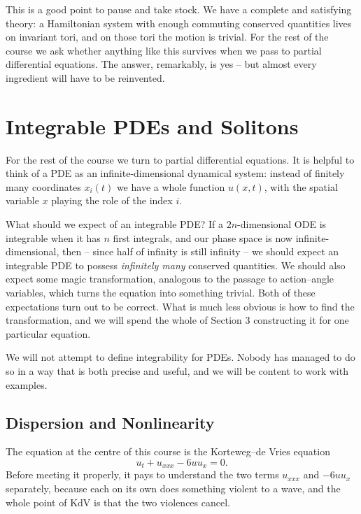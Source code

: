 \documentclass[a4paper]{scrartcl}
\begin{document}
This is a good point to pause and take stock. We have a complete and satisfying theory: a Hamiltonian system with enough commuting conserved quantities lives on invariant tori, and on those tori the motion is trivial. For the rest of the course we ask whether anything like this survives when we pass to partial differential equations. The answer, remarkably, is yes -- but almost every ingredient will have to be reinvented.

\section{Integrable PDEs and Solitons}

For the rest of the course we turn to partial differential equations. It is helpful to think of a PDE as an infinite-dimensional dynamical system: instead of finitely many coordinates $x_i(t)$ we have a whole function $u(x,t)$, with the spatial variable $x$ playing the role of the index $i$.

What should we expect of an integrable PDE? If a $2n$-dimensional ODE is integrable when it has $n$ first integrals, and our phase space is now infinite-dimensional, then -- since half of infinity is still infinity -- we should expect an integrable PDE to possess \emph{infinitely many} conserved quantities. We should also expect some magic transformation, analogous to the passage to action--angle variables, which turns the equation into something trivial. Both of these expectations turn out to be correct. What is much less obvious is how to find the transformation, and we will spend the whole of Section 3 constructing it for one particular equation.

We will not attempt to define integrability for PDEs. Nobody has managed to do so in a way that is both precise and useful, and we will be content to work with examples.

\subsection{Dispersion and Nonlinearity}

The equation at the centre of this course is the Korteweg--de Vries equation
$$
u_t + u_{xxx} - 6uu_x = 0.
$$
Before meeting it properly, it pays to understand the two terms $u_{xxx}$ and $-6uu_x$ separately, because each on its own does something violent to a wave, and the whole point of KdV is that the two violences cancel.
\end{document}

